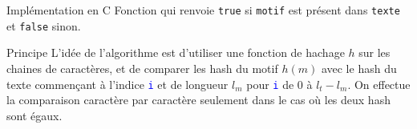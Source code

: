 \documentclass[10pt]{beamer}
\begin{document}
\begin{frame}{\Ctitle}{\stitle}
	\begin{block}{Implémentation en C}
		Fonction qui renvoie {\tt true} si {\tt motif} est présent dans {\tt texte} et {\tt false} sinon.
	\end{block}
\end{frame}

\begin{frame}{\Ctitle}{\stitle}
	\begin{block}{Principe}
		L'idée de l'algorithme est d'utiliser une fonction de hachage $h$ sur les chaines de caractères, et de comparer les hash du motif $h(m)$ avec le hash du texte commençant à l'indice \textcolor{blue}{\tt i} et de longueur $l_m$ pour {\textcolor{blue}{\tt i}} de 0 à $l_t-l_m$. On effectue la comparaison caractère par caractère seulement dans le cas où les deux hash sont égaux.
	\end{block}
\end{frame}
\end{document}
